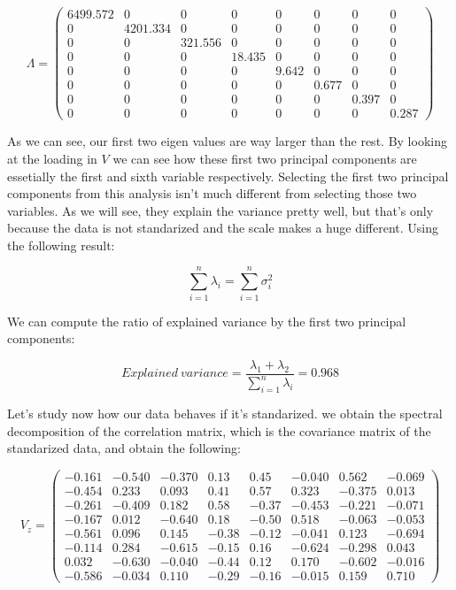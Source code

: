 \documentclass[11pt,a4paper]{article}
\begin{document}
	$$ \Lambda = 
	\begin{pmatrix}
		6499.572 & 0        & 0       & 0      & 0     & 0     & 0     & 0     \\
		0        & 4201.334 & 0       & 0      & 0     & 0     & 0     & 0     \\
		0        & 0        & 321.556 & 0      & 0     & 0     & 0     & 0     \\
		0        & 0        & 0       & 18.435 & 0     & 0     & 0     & 0     \\
		0        & 0        & 0       & 0      & 9.642 & 0     & 0     & 0     \\
		0        & 0        & 0       & 0      & 0     & 0.677 & 0     & 0     \\
		0        & 0        & 0       & 0      & 0     & 0     & 0.397 & 0     \\
		0        & 0        & 0       & 0      & 0     & 0     & 0     & 0.287
	\end{pmatrix} 
	$$ 
	
	As we can see, our first two eigen values are way larger than the rest. By looking at the loading in $V$ we can see how these first two principal components are essetially the first and sixth variable respectively. Selecting the first two principal components from this analysis isn't much different from selecting those two variables. As we will see, they explain the variance pretty well, but that's only because the data is not standarized and the scale makes a huge different. Using the following result:
	
	$$ \sum_{i=1}^{n} \lambda_i = \sum_{i=1}^{n} \sigma_i^2 $$
	
	We can compute the ratio of explained variance by the first two principal components:
	
	$$ Explained \ variance = \frac{\lambda_1 + \lambda_2}{\sum_{i=1}^{n} \lambda_i} = 0.968 $$
	
	Let's study now how our data behaves if it's standarized. we obtain the spectral decomposition of the correlation matrix, which is the covariance matrix of the standarized data, and obtain the following:
	
	 $$ V_z = 
	 \begin{pmatrix}
		 -0.161 & -0.540 & -0.370 & 0.13  & 0.45  & -0.040 & 0.562  & -0.069 \\
		-0.454 & 0.233  & 0.093  & 0.41  & 0.57  & 0.323  & -0.375 & 0.013  \\
		-0.261 & -0.409 & 0.182  & 0.58  & -0.37 & -0.453 & -0.221 & -0.071 \\
		-0.167 & 0.012  & -0.640 & 0.18  & -0.50 & 0.518  & -0.063 & -0.053 \\
		-0.561 & 0.096  & 0.145  & -0.38 & -0.12 & -0.041 & 0.123  & -0.694 \\
		-0.114 & 0.284  & -0.615 & -0.15 & 0.16  & -0.624 & -0.298 & 0.043  \\
		0.032  & -0.630 & -0.040 & -0.44 & 0.12  & 0.170  & -0.602 & -0.016 \\
		-0.586 & -0.034 & 0.110  & -0.29 & -0.16 & -0.015 & 0.159  & 0.710 
	 \end{pmatrix} 
	 $$ 
	 
\end{document}

